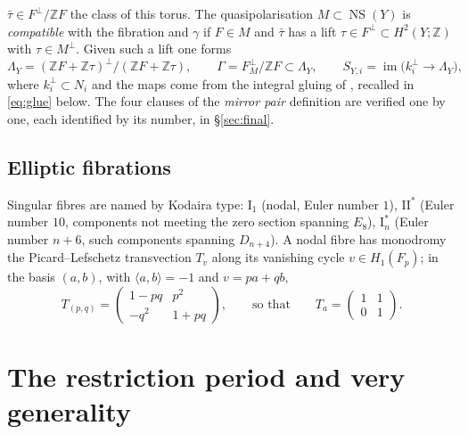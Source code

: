 \documentclass[12pt]{article}
\newcommand{\Z}{\mathbb Z}
\newcommand{\NS}{\operatorname{NS}}
\newcommand{\im}{\operatorname{im}}
\newcommand{\II}{\mathrm{II}}
\newcommand{\I}{\mathrm{I}}
\theoremstyle{definition}
\theoremstyle{remark}
\begin{document}
\(\bar\tau\in F^\perp/\Z F\) the class of this torus. The
quasipolarisation \(M\subset\NS(Y)\) is \emph{compatible} with the
fibration and \(\gamma\) \cite[Definition~4.21]{GT} if \(F\in M\) and
\(\bar\tau\) has a lift \(\tau\in F^\perp\subset H^2(Y;\Z)\) with
\(\tau\in M^\perp\). Given such a lift one forms
\begin{equation}\label{eq:LambdaY}
 \Lambda_Y=(\Z F+\Z\tau)^\perp/(\Z F+\Z\tau),\qquad
 \Gamma=F^\perp_M/\Z F\subset\Lambda_Y,\qquad
 S_{Y,i}=\im\bigl(k_i^\perp\longrightarrow\Lambda_Y\bigr),
\end{equation}
where \(k_i^\perp\subset N_i\) and the maps come from the integral
gluing of \cite[Propositions~4.18 and~4.20]{GT}, recalled in
\eqref{eq:glue} below. The four clauses of the \emph{mirror pair} definition
\cite[Definition~5.1]{GT} are verified one by one, each identified by
its number, in \S\ref{sec:final}.

\subsection{Elliptic fibrations}

Singular fibres are named by Kodaira type: \(\I_1\) (nodal, Euler
number \(1\)), \(\II^*\) (Euler number \(10\), components not meeting
the zero section spanning \(E_8\)), \(\I_n^*\) (Euler number \(n+6\),
such components spanning \(D_{n+4}\)). A nodal fibre has monodromy the Picard--Lefschetz
transvection \(T_v\) along its vanishing cycle \(v\in H_1(F_p)\); in
the basis \((a,b)\), with \(\langle a,b\rangle=-1\) and \(v=pa+qb\),
\begin{equation}\label{eq:PL}
 T_{(p,q)}=\left(\begin{smallmatrix}1-pq&p^2\\-q^2&1+pq\end{smallmatrix}\right),
 \qquad\text{so that}\qquad
 T_a=\left(\begin{smallmatrix}1&1\\0&1\end{smallmatrix}\right).
\end{equation}

\section{The restriction period and very generality}\label{sec:period}
\end{document}
